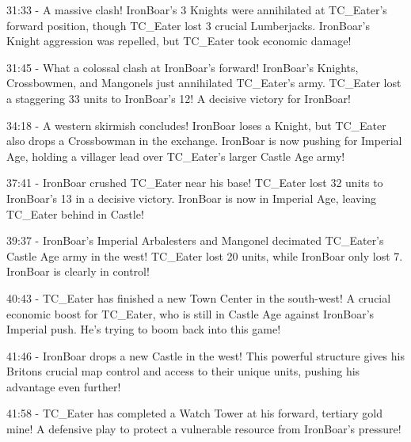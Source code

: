 31:33 - A massive clash! IronBoar's 3 Knights were annihilated at TC\_Eater's forward position, though TC\_Eater lost 3 crucial Lumberjacks. IronBoar's Knight aggression was repelled, but TC\_Eater took economic damage! \par \vspace{1em}

31:45 - What a colossal clash at IronBoar's forward! IronBoar's Knights, Crossbowmen, and Mangonels just annihilated TC\_Eater's army. TC\_Eater lost a staggering 33 units to IronBoar's 12! A decisive victory for IronBoar! \par \vspace{1em}

34:18 - A western skirmish concludes! IronBoar loses a Knight, but TC\_Eater also drops a Crossbowman in the exchange. IronBoar is now pushing for Imperial Age, holding a villager lead over TC\_Eater's larger Castle Age army! \par \vspace{1em}

37:41 - IronBoar crushed TC\_Eater near his base! TC\_Eater lost 32 units to IronBoar's 13 in a decisive victory. IronBoar is now in Imperial Age, leaving TC\_Eater behind in Castle! \par \vspace{1em}

39:37 - IronBoar's Imperial Arbalesters and Mangonel decimated TC\_Eater's Castle Age army in the west! TC\_Eater lost 20 units, while IronBoar only lost 7. IronBoar is clearly in control! \par \vspace{1em}

40:43 - TC\_Eater has finished a new Town Center in the south-west! A crucial economic boost for TC\_Eater, who is still in Castle Age against IronBoar's Imperial push. He's trying to boom back into this game! \par \vspace{1em}

41:46 - IronBoar drops a new Castle in the west! This powerful structure gives his Britons crucial map control and access to their unique units, pushing his advantage even further! \par \vspace{1em}

41:58 - TC\_Eater has completed a Watch Tower at his forward, tertiary gold mine! A defensive play to protect a vulnerable resource from IronBoar's pressure! \par \vspace{1em}

